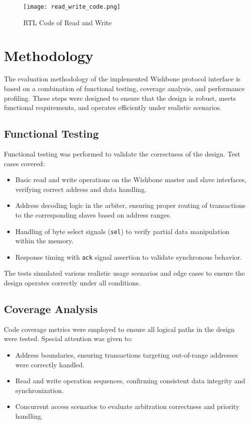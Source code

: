 \documentclass[conference]{IEEEtran}
\begin{document}
\begin{figure}[htbp]
    \centering
    \texttt{[image: read\_write\_code.png]}
    \caption{RTL Code of Read and Write}
    \label{read_write_code}
\end{figure}



\section{Methodology}

The evaluation methodology of the implemented Wishbone protocol interface is based on a combination of functional testing, coverage analysis, and performance profiling. These steps were designed to ensure that the design is robust, meets functional requirements, and operates efficiently under realistic scenarios.

\subsection{Functional Testing}
Functional testing was performed to validate the correctness of the design. Test cases covered:
\begin{itemize}
    \item Basic read and write operations on the Wishbone master and slave interfaces, verifying correct address and data handling.
    \item Address decoding logic in the arbiter, ensuring proper routing of transactions to the corresponding slaves based on address ranges.
    \item Handling of byte select signals (\texttt{sel}) to verify partial data manipulation within the memory.
    \item Response timing with \texttt{ack} signal assertion to validate synchronous behavior.
\end{itemize}
The tests simulated various realistic usage scenarios and edge cases to ensure the design operates correctly under all conditions.

\subsection{Coverage Analysis}
Code coverage metrics were employed to ensure all logical paths in the design were tested. Special attention was given to:
\begin{itemize}
    \item Address boundaries, ensuring transactions targeting out-of-range addresses were correctly handled.
    \item Read and write operation sequences, confirming consistent data integrity and synchronization.
    \item Concurrent access scenarios to evaluate arbitration correctness and priority handling.
\end{itemize}
\end{document}
